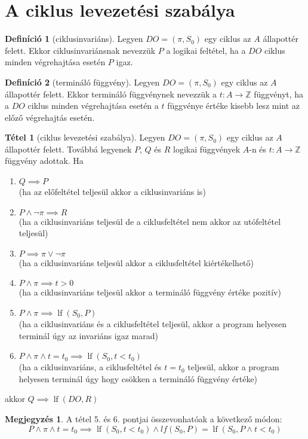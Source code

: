 \documentclass[a4paper,12pt]{article}
\theoremstyle{definition}
\newtheorem*{definition*}{Definíció}
\newtheorem*{remark}{Megjegyzés}
\newtheorem*{theorem*}{Tétel}
\DeclareMathOperator{\lf}{lf}
\begin{document}
	\section{A ciklus levezetési szabálya}
	\begin{definition*}[ciklusinvariáns]
		Legyen $DO = (\pi, S_0) $ egy ciklus az $A$ állapottér felett. Ekkor ciklusinvariánsnak nevezzük $P$ a  logikai feltétel, ha a $DO$ ciklus minden végrehajtása esetén $P$ igaz.
	\end{definition*}
	\begin{definition*}[termináló függvény]
		Legyen $DO = (\pi, S_0) $ egy ciklus az $A$ állapottér felett. Ekkor termináló függvénynek nevezzük a  $t: A \rightarrow \mathbb{Z}$ függvényt, ha a $DO$ ciklus minden végrehajtása esetén a $t$ függvénye értéke kisebb lesz mint az előző végrehajtás esetén.
	\end{definition*}
	\begin{theorem*}[ciklus levezetési szabálya]
		Legyen $DO = (\pi, S_0) $ egy ciklus az $A$ állapottér felett. Továbbá legyenek $P$, $Q$ és $R$ logikai függvények $A$-n és $t:A \rightarrow \mathbb{Z}$ függvény adottak. Ha
		\begin{enumerate}
			\item $ Q \implies P $ \\ (ha az előfeltétel teljesül akkor a ciklusinvariáns is)
			\item $ P \land \lnot \pi \implies R $ \\ (ha a ciklusinvariáns teljesül de a ciklusfeltétel nem akkor az utófeltétel teljesül)
			\item $ P \implies \pi \lor \lnot \pi $ \\ (ha a ciklusinvariáns teljesül akkor a ciklusfeltétel kiértékelhető)
			\item $ P \land \pi \implies t > 0 $ \\ (ha a ciklusinvariáns teljesül akkor a termináló függvény értéke pozitív)
			\item $ P \land \pi \implies \lf(S_0,P) $ \\ (ha a ciklusinvariáns és a ciklusfeltétel teljesül, akkor a program helyesen terminál úgy az invariáns igaz marad)
			\item $ P \land \pi \land t = t_0 \implies \lf(S_0,t<t_0) $ \\ (ha a ciklusinvariáns, a ciklusfeltétel és $t = t_0$ teljesül, akkor a program helyesen terminál úgy hogy csökken a termináló függvény értéke)
		\end{enumerate}
		akkor $ Q \implies \lf(DO,R) $
		\begin{remark}
			A tétel 5. és 6. pontjai összevonhatóak a következő módon:
			\[
			P \land \pi \land t = t_0 \implies \lf(S_0, t<t_0) \land lf (S_0,P) = \lf(S_0,P \land t<t_0) \]
		\end{remark}
	\end{theorem*}
\end{document}
